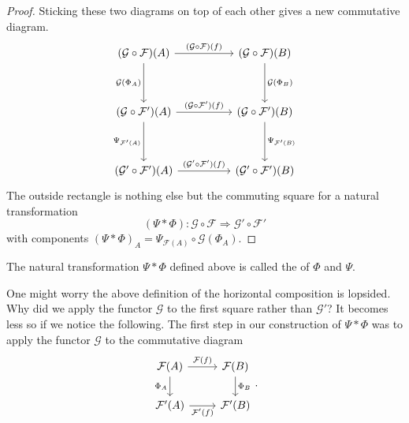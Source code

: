 \documentclass[notes.tex]{subfiles}
\begin{document}
\begin{proof}
  Sticking these two diagrams on top of each other gives a new commutative diagram.
  \begin{equation*}
    \begin{tikzcd}[row sep=huge, column sep=huge]
      (\mathcal{G} \circ \mathcal{F})(A)
      \arrow[d, swap, "\mathcal{G}(\Phi_{A})"]
      \arrow[r, "(\mathcal{G} \circ \mathcal{F})(f)"]
      & (\mathcal{G} \circ \mathcal{F})(B)
      \arrow[d, "\mathcal{G}(\Phi_{B})"]
      \\
      (\mathcal{G} \circ \mathcal{F}')(A)
      \arrow[r, "(\mathcal{G} \circ \mathcal{F}')(f)"]
      \arrow[d, swap, "\Psi_{\mathcal{F}'(A)}"]
      & (\mathcal{G} \circ \mathcal{F}')(B)
      \arrow[d, "\Psi_{\mathcal{F}'(B)}"]
      \\
      (\mathcal{G}' \circ \mathcal{F}')(A)
      \arrow[r, "(\mathcal{G}' \circ \mathcal{F}')(f)"]
      & (\mathcal{G}' \circ \mathcal{F}')(B)
    \end{tikzcd}
  \end{equation*}
  The outside rectangle is nothing else but the commuting square for a natural transformation
  \begin{equation*}
    (\Psi * \Phi)\colon \mathcal{G} \circ \mathcal{F} \Rightarrow \mathcal{G'} \circ \mathcal{F}'
  \end{equation*}
  with components ${(\Psi * \Phi)}_{A} = \Psi_{\mathcal{F}(A)} \circ \mathcal{G}(\Phi_{A})$.
\end{proof}

\begin{definition}
  \label{def:horizontalcomposition}
  The natural transformation $\Psi * \Phi$ defined above is called the  of $\Phi$ and $\Psi$.
\end{definition}

One might worry the above definition of the horizontal composition is lopsided. Why did we apply the functor $\mathcal{G}$ to the first square rather than $\mathcal{G}'$? It becomes less so if we notice the following. The first step in our construction of $\Psi * \Phi$ was to apply the functor $\mathcal{G}$ to the commutative diagram
\begin{equation*}
  \begin{tikzcd}
    \mathcal{F}(A)
    \arrow[d, swap, "\Phi_{A}"]
    \arrow[r, "\mathcal{F}(f)"]
    & \mathcal{F}(B)
    \arrow[d, "\Phi_{B}"]
    \\
    \mathcal{F}'(A)
    \arrow[r, swap, "\mathcal{F}'(f)"]
    & \mathcal{F}'(B)
  \end{tikzcd}.
\end{equation*}
\end{document}

